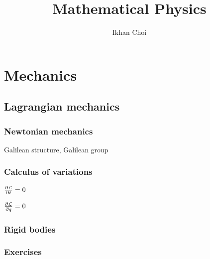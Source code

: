 \documentclass{../../large}
\begin{document}
\title{Mathematical Physics}
\author{Ikhan Choi}
\maketitle
\tableofcontents

\part{Mechanics}

\chapter{Lagrangian mechanics}
\section{Newtonian mechanics}
\begin{prb}
Galilean structure, Galilean group
\end{prb}
\begin{prb}
\end{prb}

\section{Calculus of variations}
\begin{prb}
\end{prb}
\begin{prb}
$\pd{\cL}{t}=0$
\end{prb}
\begin{prb}
$\pd{\cL}{q}=0$
\end{prb}
\begin{prb}
\end{prb}

\section{Rigid bodies}
\begin{prb}
\end{prb}
\begin{prb}
\end{prb}
\begin{prb}
\end{prb}

\section*{Exercises}
\end{document}
